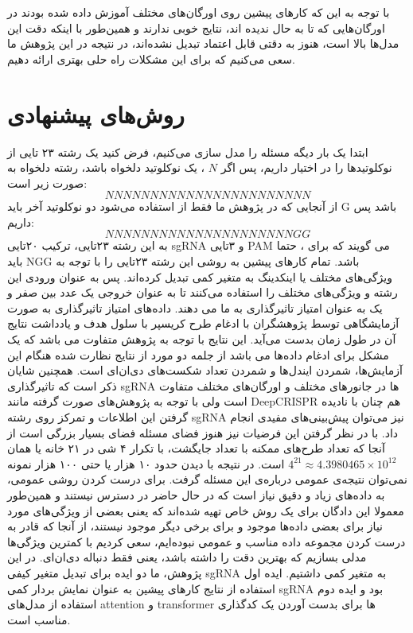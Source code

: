 \documentclass[12pt,a4paper,BCOR=.7cm,headsepline,bibliography=totoc]{report}
\begin{document}
\begin{table}[H]
\begin{adjustbox}{center}
{\begin{tabularx}{1.1\textwidth}{|Y|Y|Y|Y|Y|Y|Y|}
	&  &  &  &  &  &  \\ \hline

    \end{tabularx}}
\end{adjustbox}
\end{table}

با توجه به این که کار‌های پیشین روی اورگان‌های مختلف آموزش داده شده بودند در اورگان‌هایی که تا به حال ندیده اند، نتایج خوبی ندارند و همین‌طور با اینکه دقت این مدل‌ها بالا است، هنوز به دقتی قابل اعتماد تبدیل نشده‌اند، در نتیجه در این پژوهش ما سعی می‌کنیم که برای این مشکلات راه حلی بهتری ارائه دهیم.

\chapter{روش‌های پیشنهادی}
ابتدا یک بار دیگه مسئله را مدل سازی می‌کنیم، فرض کنید یک رشته ۲۳ تایی از نوکلوتید‌ها را در اختیار داریم، پس اگر $N$ ، یک نوکلوتید دلخواه باشد، رشته دلخواه به صورت زیر است:
$$
NNNNNNNNNNNNNNNNNNNNNNN
$$
از آنجایی که در پژوهش ما فقط از  استفاده می‌شود دو نوکلوتید آخر باید G باشد پس داریم:
$$
NNNNNNNNNNNNNNNNNNNNNGG
$$
به این رشته ۲۳تایی، ترکیب ۲۰‌تایی sgRNA و ۳تایی PAM می گویند که برای  ، حتما باید NGG باشد. 
تمام کارهای پیشین به روشی این رشته ۲۳تایی را با توجه به ویژگی‌های مختلف یا اینکدینگ به متغیر کمی تبدیل کرده‌اند. پس به عنوان ورودی این رشته و ویژگی‌های مختلف را استفاده می‌کنند تا به عنوان خروجی یک عدد بین صفر و یک به عنوان امتیاز تاثیرگذاری به ما می دهند. داده‌های امتیاز تاثیرگذاری به صورت آزمایشگاهی توسط پژوهشگران با ادغام طرح کریسپر با سلول هدف و یادداشت نتایج آن در طول زمان بدست می‌آید. این نتایج با توجه به پژوهش متفاوت می باشد که یک مشکل برای ادغام داده‌ها می باشد از جلمه دو مورد از نتایج نظارت شده هنگام این آزمایش‌ها، شمردن ایندل‌ها و شمردن تعداد شکست‌های دی‌ان‌ای است. همچنین شایان ذکر است که تاثیرگذاری sgRNA ها در جانور‌های مختلف و اورگان‌های مختلف متفاوت است ولی با توجه به پژوهش‌های صورت گرفته مانند DeepCRISPR \cite{DeepCRISPR} هم چنان با نادیده گرفتن این اطلاعات و تمرکز روی رشته sgRNA نیز می‌توان پیش‌بینی‌های مفیدی انجام داد. با در نظر گرفتن این فرضیات نیز هنوز فضای مسئله فضای بسیار بزرگی است از آنجا که تعداد طرح‌های ممکنه با تعداد جایگشت، با تکرار ۴ شی در ۲۱ خانه یا همان 
$4^{21} \approx 4.3980465 \times 10^{12}$
است. در نتیجه با دیدن حدود ۱۰ هزار یا حتی ۱۰۰ هزار نمونه نمی‌توان نتیجه‌ی عمومی درباره‌ی این مسئله گرفت.
برای درست کردن روشی عمومی، به داده‌های زیاد و دقیق نیاز است که در حال حاضر در دسترس نیستند و همین‌طور معمولا این دادگان برای یک روش خاص تهیه شده‌اند که یعنی بعضی از ویژگی‌های مورد نیاز برای بعضی داده‌ها موجود و برای برخی دیگر موجود نیستند، از آنجا که قادر به درست کردن مجموعه داده مناسب و عمومی نبوده‌ایم، سعی کردیم با کمترین ویژگی‌ها مدلی بسازیم که بهترین دقت را داشته باشد، یعنی فقط دنباله دی‌ان‌ای. در این پژوهش، ما دو ایده برای تبدیل متغیر کیفی sgRNA به متغیر کمی داشتیم. ایده اول استفاده از نتایج کار‌های پیشین به عنوان نمایش بردار کمی sgRNA بود و ایده دوم استفاده از مدل‌های attention و transformer ها برای بدست آوردن یک کدگذاری مناسب است.
\end{document}

